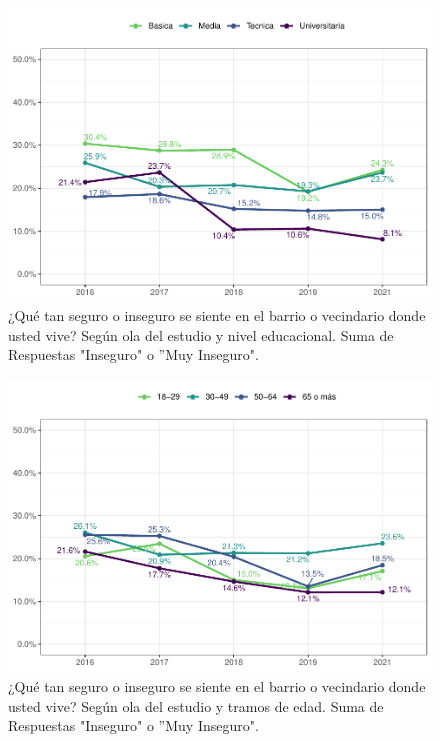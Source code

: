 \documentclass[
  12pt,
  openany]{book}
\begin{document}
\begin{figure}

{\centering \includegraphics{reporte-elsoc_files/figure-latex/seguri-educ-1} 

}

\caption{¿Qué tan seguro o inseguro se siente en el barrio o vecindario donde usted vive? Según ola del estudio y nivel educacional. Suma de Respuestas "Inseguro" o ”Muy Inseguro".}\label{fig:seguri-educ}
\end{figure}

\begin{figure}

{\centering \includegraphics{reporte-elsoc_files/figure-latex/seguri-edad-1} 

}

\caption{¿Qué tan seguro o inseguro se siente en el barrio o vecindario donde usted vive? Según ola del estudio y tramos de edad. Suma de Respuestas "Inseguro" o ”Muy Inseguro".}\label{fig:seguri-edad}
\end{figure}
\end{document}
